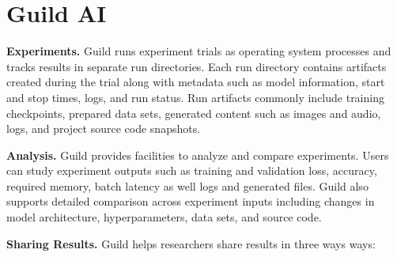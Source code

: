 \documentclass{article}
\begin{document}

\printAffiliationsAndNotice{\sysmlEqualContribution}

\section{Guild AI}

\textbf{Experiments.} Guild runs experiment trials as operating system
processes and tracks results in separate run directories. Each run
directory contains artifacts created during the trial along with
metadata such as model information, start and stop times, logs, and
run status. Run artifacts commonly include training checkpoints,
prepared data sets, generated content such as images and audio, logs,
and project source code snapshots.

\textbf{Analysis.} Guild provides facilities to analyze and compare
experiments. Users can study experiment outputs such as training and
validation loss, accuracy, required memory, batch latency as well logs
and generated files. Guild also supports detailed comparison across
experiment inputs including changes in model architecture,
hyperparameters, data sets, and source code.

\textbf{Sharing Results.} Guild helps researchers share results in
three ways ways:
\end{document}

